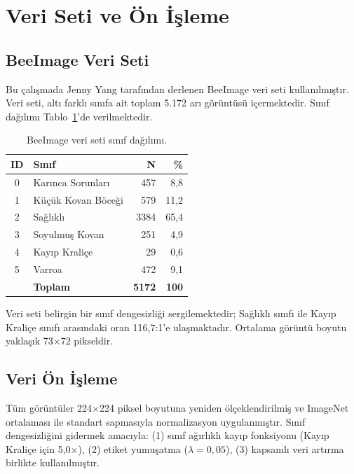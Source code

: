 \documentclass[conference]{IEEEtran}
\begin{document}
\section{Veri Seti ve Ön İşleme}

\subsection{BeeImage Veri Seti}

Bu çalışmada Jenny Yang tarafından derlenen BeeImage veri seti \cite{yang2018} kullanılmıştır. Veri seti, altı farklı sınıfa ait toplam 5.172 arı görüntüsü içermektedir. Sınıf dağılımı Tablo~\ref{tab:dataset}'de verilmektedir.

\begin{table}[!ht]
\centering
\caption{BeeImage veri seti sınıf dağılımı.}
\label{tab:dataset}
\begin{tabular}{clrr}
\toprule
\textbf{ID} & \textbf{Sınıf} & \textbf{N} & \textbf{\%} \\
\midrule
0 & Karınca Sorunları     & 457  & 8,8  \\
1 & Küçük Kovan Böceği    & 579  & 11,2 \\
2 & Sağlıklı              & 3384 & 65,4 \\
3 & Soyulmuş Kovan        & 251  & 4,9  \\
4 & Kayıp Kraliçe         & 29   & 0,6  \\
5 & Varroa                & 472  & 9,1  \\
\midrule
  & \textbf{Toplam}       & \textbf{5172} & \textbf{100} \\
\bottomrule
\end{tabular}
\end{table}

Veri seti belirgin bir sınıf dengesizliği sergilemektedir; Sağlıklı sınıfı ile Kayıp Kraliçe sınıfı arasındaki oran 116,7:1'e ulaşmaktadır. Ortalama görüntü boyutu yaklaşık 73$\times$72 pikseldir.

\subsection{Veri Ön İşleme}

Tüm görüntüler 224$\times$224 piksel boyutuna yeniden ölçeklendirilmiş ve ImageNet ortalaması ile standart sapmasıyla normalizasyon uygulanmıştır. Sınıf dengesizliğini gidermek amacıyla: (1) sınıf ağırlıklı kayıp fonksiyonu (Kayıp Kraliçe için 5,0$\times$), (2) etiket yumuşatma ($\lambda = 0{,}05$), (3) kapsamlı veri artırma birlikte kullanılmıştır.
\end{document}
